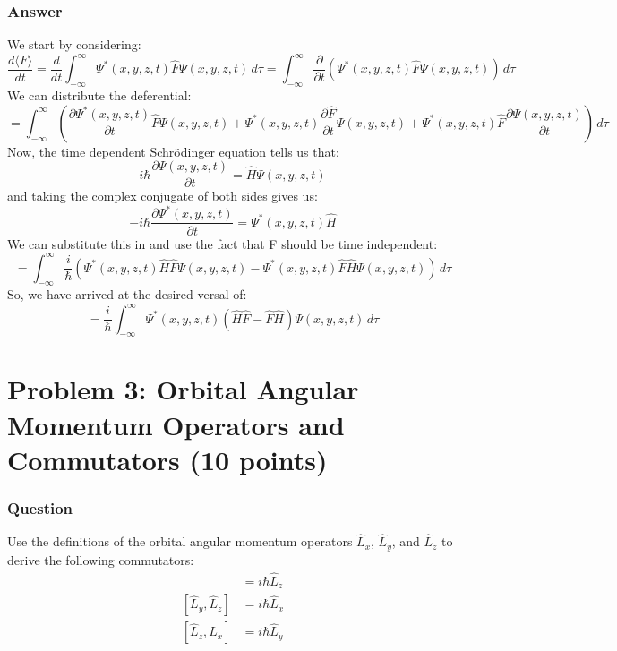 \documentclass{article}
\begin{document}
\subsubsection{Answer}
We start by considering:
\begin{equation}
    \frac{d\langle F \rangle}{dt} = \frac{d}{dt}\int_{-\infty}^{\infty} \Psi^*(x, y, z, t)\hat{F}\Psi(x, y, z, t)\,d\tau = \int_{-\infty}^{\infty} \frac{\partial}{\partial t}\left(\Psi^*(x, y, z, t)\hat{F}\Psi(x, y, z, t)\right)\,d\tau
\end{equation}
We can distribute the deferential:
\begin{equation}
    = \int_{-\infty}^{\infty} \left(\frac{\partial \Psi^*(x, y, z, t)}{\partial t}\hat{F}\Psi(x, y, z, t) + \Psi^*(x, y, z, t)\frac{\partial \hat{F}}{\partial t}\Psi(x, y, z, t) + \Psi^*(x, y, z, t)\hat{F}\frac{\partial \Psi(x, y, z, t)}{\partial t}\right)\,d\tau
\end{equation}
Now, the time dependent Schrödinger equation tells us that:
\begin{equation}
    i\hbar \frac{\partial \Psi(x, y, z, t)}{\partial t} = \hat{H}\Psi(x, y, z, t)
\end{equation}
and taking the complex conjugate of both sides gives us:
\begin{equation}
    -i\hbar \frac{\partial \Psi^*(x, y, z, t)}{\partial t} = \Psi^*(x, y, z, t)\hat{H}
\end{equation}
We can substitute this in and use the fact that F should be time independent:
\begin{equation}
    = \int_{-\infty}^{\infty} \frac{i}{\hbar} \left(\Psi^*(x, y, z, t)\hat{H}\hat{F}\Psi(x, y, z, t) - \Psi^*(x, y, z, t)\hat{F}\hat{H}\Psi(x, y, z, t)\right)\,d\tau
\end{equation}
So, we have arrived at the desired versal of:
\begin{equation}
    = \frac{i}{\hbar} \int_{-\infty}^{\infty} \Psi^*(x, y, z, t)(\hat{H}\hat{F} - \hat{F}\hat{H})\Psi(x, y, z, t)\,d\tau
\end{equation}
\section{Problem 3: Orbital Angular Momentum Operators and Commutators (10 points)}
\subsubsection{Question}
Use the definitions of the orbital angular momentum operators $\hat{L}_x$, $\hat{L}_y$, and $\hat{L}_z$ to derive the following commutators:
\begin{align*}
    [\hat{L}_x, \hat{L}_y] &= i\hbar\hat{L}_z \\
    [\hat{L}_y, \hat{L}_z] &= i\hbar\hat{L}_x \\
    [\hat{L}_z, \hat{L}_x] &= i\hbar\hat{L}_y
\end{align*}
\end{document}
